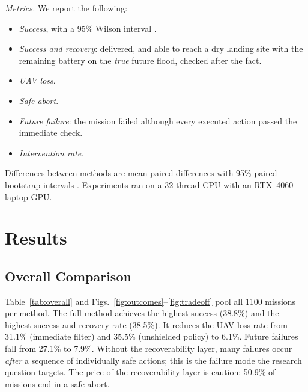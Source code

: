 \documentclass{ieeeaccess}
\begin{document}
\emph{Metrics.} We report the following:
\begin{itemize}
\item \emph{Success}, with a 95\% Wilson interval \cite{wilson1927}.
\item \emph{Success and recovery}: delivered, and able to reach a dry landing site with the remaining battery on the \emph{true} future flood, checked after the fact.
\item \emph{UAV loss}.
\item \emph{Safe abort}.
\item \emph{Future failure}: the mission failed although every executed action passed the immediate check.
\item \emph{Intervention rate}.
\end{itemize}
Differences between methods are mean paired differences with 95\% paired-bootstrap intervals \cite{efron1993}. Experiments ran on a 32-thread CPU with an RTX~4060 laptop GPU.

\section{Results}
\label{sec:results}

\subsection{Overall Comparison}
Table~\ref{tab:overall} and Figs.~\ref{fig:outcomes}--\ref{fig:tradeoff} pool all 1100 missions per method. The full method achieves the highest success (38.8\%) and the highest success-and-recovery rate (38.5\%). It reduces the UAV-loss rate from 31.1\% (immediate filter) and 35.5\% (unshielded policy) to 6.1\%. Future failures fall from 27.1\% to 7.9\%. Without the recoverability layer, many failures occur \emph{after} a sequence of individually safe actions; this is the failure mode the research question targets. The price of the recoverability layer is caution: 50.9\% of missions end in a safe abort.
\end{document}
